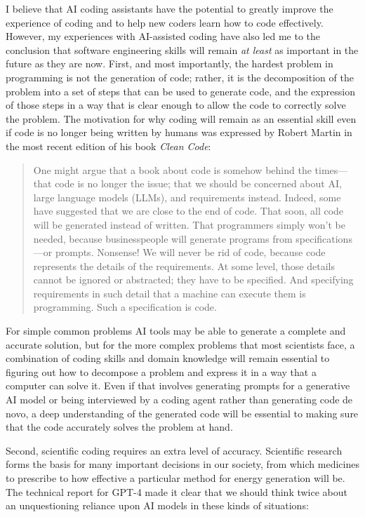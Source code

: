 I believe that AI coding assistants have the potential to greatly improve the experience of coding and to help new coders learn how to code effectively.
However, my experiences with AI-assisted coding have also led me to the conclusion that software engineering skills will remain \textit{at least} as important in the future as they are now.
First, and most importantly, the hardest problem in programming is not the generation of code; rather, it is the decomposition of the problem into a set of steps that can be used to generate code, and the expression of those steps in a way that is clear enough to allow the code to correctly solve the problem.
The motivation for why coding will remain as an essential skill even if code is no longer being written by humans was expressed by Robert Martin in the most recent edition of his book \textit{Clean Code}:

\begin{quote}
One might argue that a book about code is somehow behind the times—that code is no longer the issue; that we should be concerned about AI, large language models (LLMs), and requirements instead. Indeed, some have suggested that we are close to the end of code. That soon, all code will be generated instead of written. That programmers simply won’t be needed, because businesspeople will generate programs from specifications—or prompts. Nonsense! We will never be rid of code, because code represents the details of the requirements. At some level, those details cannot be ignored or abstracted; they have to be specified. And specifying requirements in such detail that a machine can execute them is programming. Such a specification is code. \citep{Martin:2025aa}
\end{quote}

For simple common problems AI tools may be able to generate a complete and accurate solution, but for the more complex problems that most scientists face, a combination of coding skills and domain knowledge will remain essential to figuring out how to decompose a problem and express it in a way that a computer can solve it.
Even if that involves generating prompts for a generative AI model or being interviewed by a coding agent rather than generating code de novo, a deep understanding of the generated code will be essential to making sure that the code accurately solves the problem at hand.

Second, scientific coding requires an extra level of accuracy.
Scientific research forms the basis for many important decisions in our society, from which medicines to prescribe to how effective a particular method for energy generation will be.
The technical report for GPT-4 made it clear that we should think twice about an unquestioning reliance upon AI models in these kinds of situations:

